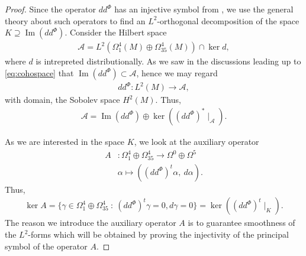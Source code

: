 \documentclass[10pt,a4paper]{amsart}
\DeclareMathOperator{\Ima}{Im}
\def\cA{\mathcal{A}}
\def\ddphi{dd^{\Phi}}
\begin{document}
\begin{proof}
Since the operator $\ddphi$ has an injective symbol from , we use the general theory about such operators to find an $L^2$-orthogonal decomposition of the space $K\supseteq \Ima(\ddphi)$. Consider the Hilbert space
\begin{align*}
\cA = L^2(\Omega^4_1(M)\oplus \Omega^4_{35}(M)) \cap \ker d,
\end{align*}
where $d$ is intrepreted distributionally. As we saw in the discussions leading up to \cref{eq:cohospace} that $\Ima(\ddphi)\subset \cA$, hence we may regard
\begin{align*}
\ddphi: L^2(M) \rightarrow \cA,
\end{align*}
with domain, the Sobolev space $H^2(M)$. Thus,
\begin{align}\label{eq:hilbertspaceimage}
\cA = \Ima(\ddphi) \oplus \ker \left((dd^{\Phi})^*\mid_{\cA}\right).
\end{align}

As we are interested in the space $K$, we look at the auxiliary operator 
\begin{align*}
A&: \Omega^4_1\oplus \Omega^4_{35} \rightarrow \Omega^0 \oplus \Omega^5\\
& \alpha \mapsto \left((\ddphi)^t\alpha,\ d\alpha \right).
\end{align*}
Thus, 
\begin{align*}
\ker A =\{ \gamma \in \Omega^4_1\oplus \Omega^4_{35}\ :\ (\ddphi)^t\gamma=0, d\gamma=0\} = \ker\left( (\ddphi)^t\mid_K \right).    \end{align*}
The reason we introduce the auxiliary operator $A$ is to  guarantee smoothness of the $L^2$-forms which will be obtained by proving the injectivity of the principal symbol of the operator $A$.


\end{proof}
\end{document}
